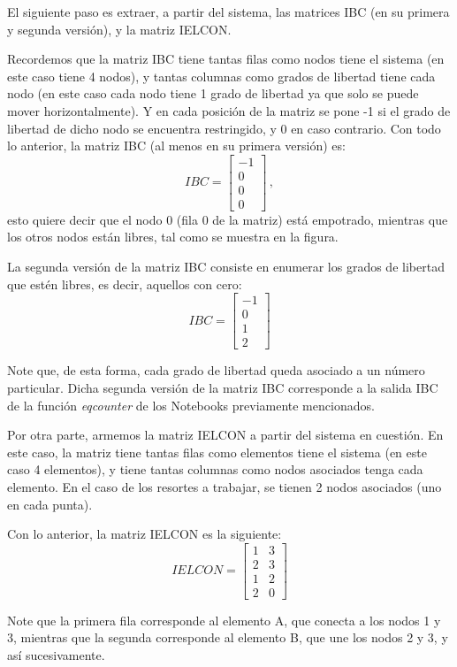 El siguiente paso es extraer, a partir del sistema, las matrices IBC (en su 
primera y segunda versión), y la matriz IELCON.

Recordemos que la matriz IBC tiene tantas filas como nodos tiene el sistema (en 
este caso tiene 4 nodos), y tantas columnas como grados de libertad tiene cada 
nodo (en este caso cada nodo tiene 1 grado de libertad ya que solo se puede 
mover horizontalmente). Y en cada posición de la matriz se pone -1 si el grado 
de libertad de dicho nodo se encuentra restringido, y 0 en caso contrario. Con 
todo lo anterior, la matriz IBC (al menos en su primera versión) es:
$$IBC = 
\begin{bmatrix}
-1 \\ 
0 \\
0 \\
0
\end{bmatrix}\, ,
$$
esto quiere decir que el nodo 0 (fila 0 de la matriz) está empotrado, 
mientras que los otros nodos están libres, tal como se muestra en la figura.

La segunda versión de la matriz IBC consiste en enumerar los grados de libertad 
que estén libres, es decir, aquellos con cero:
$$IBC = 
\begin{bmatrix}
-1 \\
0 \\
1 \\
2
\end{bmatrix}
$$

Note que, de esta forma, cada grado de libertad queda asociado a un número 
particular. Dicha segunda versión de la matriz IBC corresponde a la salida IBC 
de la función \textit{eqcounter} de los Notebooks previamente mencionados.

Por otra parte, armemos la matriz IELCON a partir del sistema en cuestión. En 
este caso, la matriz tiene tantas filas como elementos tiene el sistema (en 
este caso 4 elementos), y tiene tantas columnas como nodos asociados tenga cada 
elemento. En el caso de los resortes a trabajar, se tienen 2 nodos asociados 
(uno en cada punta).

Con lo anterior, la matriz IELCON es la siguiente:
$$IELCON = 
\begin{bmatrix}
1 & 3 \\
2 & 3 \\
1 & 2 \\
2 & 0 
\end{bmatrix}
$$

Note que la primera fila corresponde al elemento A, que conecta a los nodos 1 y 
3, mientras que la segunda corresponde al elemento B, que une los nodos 2 y 3, 
y así sucesivamente.

